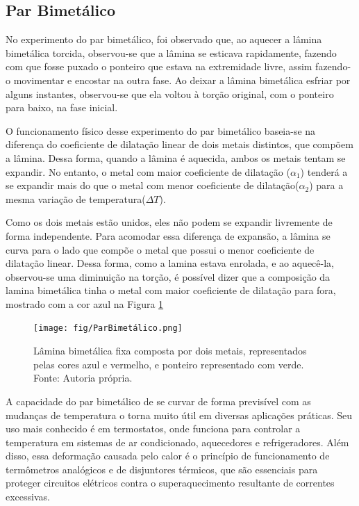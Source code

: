 \subsection{Par Bimetálico}
No experimento do par bimetálico, foi observado que, ao aquecer a lâmina bimetálica torcida, observou-se que a lâmina se esticava rapidamente, fazendo com que fosse puxado o ponteiro que estava na extremidade livre, assim fazendo-o movimentar e encostar na outra fase. Ao deixar a lâmina bimetálica esfriar por alguns instantes, observou-se que ela voltou à torção original, com o ponteiro para baixo, na fase inicial.

O funcionamento físico desse experimento do par bimetálico baseia-se na diferença do coeficiente de dilatação linear de dois metais distintos, que compõem a lâmina. Dessa forma, quando a lâmina é aquecida, ambos os metais tentam se expandir. No entanto, o metal com maior coeficiente de dilatação (\(\alpha_1\)) tenderá  a se expandir mais do que o metal com menor coeficiente de dilatação(\(\alpha_2\)) para a mesma variação de temperatura(\(\Delta T\)).

Como os dois metais estão unidos, eles não podem se expandir livremente de forma independente. Para acomodar essa diferença de expansão, a lâmina se curva para o lado que compõe o metal que possui o menor coeficiente de dilatação linear. Dessa forma, como a lamina estava enrolada, e ao aquecê-la, observou-se uma diminuição na torção, é possível dizer que a composição da lamina bimetálica tinha o metal com maior coeficiente de dilatação para fora, mostrado com a cor azul na Figura \cref{ParBimetalico}

\begin{figure}[H]
	\centering
	\texttt{[image: fig/ParBimetálico.png]}
	\caption{Lâmina bimetálica fixa composta por dois metais, representados pelas cores azul e vermelho, e ponteiro representado com verde. Fonte: Autoria própria.}
	\label{ParBimetalico}
\end{figure}

A capacidade do par bimetálico de se curvar de forma previsível com as mudanças de temperatura o torna muito útil em diversas aplicações práticas. Seu uso mais conhecido é em termostatos, onde funciona para controlar a temperatura em sistemas de ar condicionado, aquecedores e refrigeradores. Além disso, essa deformação causada pelo calor é o princípio de funcionamento de termômetros analógicos e de disjuntores térmicos, que são essenciais para proteger circuitos elétricos contra o superaquecimento resultante de correntes excessivas.

